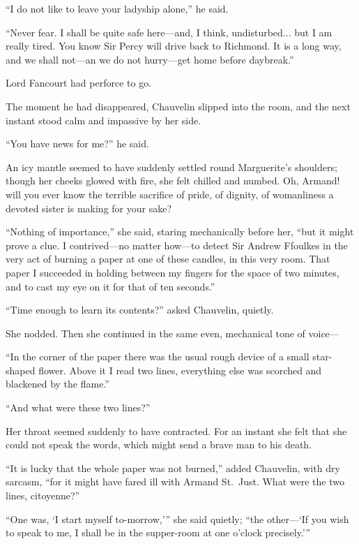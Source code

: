 \documentclass[paper=a5,BCOR=7mm,twoside,DIV=calc,12pt,usegeometry,chapterprefix,endperiod,headings=big]{scrbook}
\begin{document}
\enquote{I do not like to leave your ladyship alone,} he said.

\enquote{Never fear. I shall be quite safe here---and, I think, undisturbed... but I am really tired. You know Sir Percy will drive back to Richmond. It is a long way, and we shall not---an we do not hurry---get home before daybreak.}

Lord Fancourt had perforce to go.

The moment he had disappeared, Chauvelin slipped into the room, and the next instant stood calm and impassive by her side.

\enquote{You have news for me?} he said.

An icy mantle seemed to have suddenly settled round Marguerite's shoulders; though her cheeks glowed with fire, she felt chilled and numbed. Oh, Armand! will you ever know the terrible sacrifice of pride, of dignity, of womanliness a devoted sister is making for your sake?

\enquote{Nothing of importance,} she said, staring mechanically before her, \enquote{but it might prove a clue. I contrived---no matter how---to detect Sir Andrew Ffoulkes in the very act of burning a paper at one of these candles, in this very room. That paper I succeeded in holding between my fingers for the space of two minutes, and to cast my eye on it for that of ten seconds.}

\enquote{Time enough to learn its contents?} asked Chauvelin, quietly.

She nodded. Then she continued in the same even, mechanical tone of voice---

\enquote{In the corner of the paper there was the usual rough device of a small star-shaped flower. Above it I read two lines, everything else was scorched and blackened by the flame.}

\enquote{And what were these two lines?}

Her throat seemed suddenly to have contracted. For an instant she felt that she could not speak the words, which might send a brave man to his death.

\enquote{It is lucky that the whole paper was not burned,} added Chauvelin, with dry sarcasm, \enquote{for it might have fared ill with Armand St.~Just. What were the two lines, citoyenne?}

\enquote{One was, \enquote{I start myself to-morrow,}} she said quietly; \enquote{the other---\enquote{If you wish to speak to me, I shall be in the supper-room at one o'clock precisely.}}
\end{document}
